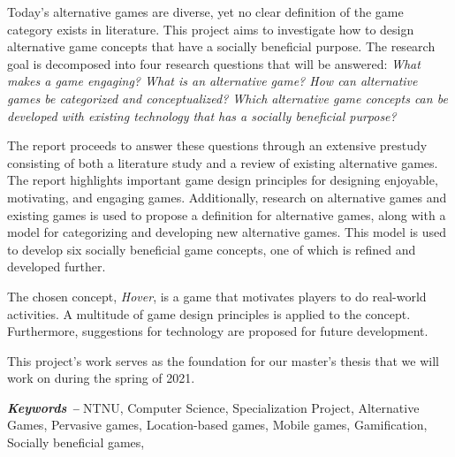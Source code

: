 \documentclass[../Main.tex]{subfiles}
\begin{document}
Today’s alternative games are diverse, yet no clear definition of the game category exists in literature. This project aims to investigate how to design alternative game concepts that have a socially beneficial purpose. The research goal is decomposed into four research questions that will be answered: \textit{What makes a game engaging? What is an alternative game? How can alternative games be categorized and conceptualized? Which alternative game concepts can be developed with existing technology that has a socially beneficial purpose?}

The report proceeds to answer these questions through an extensive prestudy consisting of both a literature study and a review of existing alternative games. The report highlights important game design principles for designing enjoyable, motivating, and engaging games. Additionally, research on alternative games and existing games is used to propose a definition for alternative games, along with a model for categorizing and developing new alternative games. This model is used to develop six socially beneficial game concepts, one of which is refined and developed further. 

The chosen concept, \textit{Hover}, is a game that motivates players to do real-world activities. A multitude of game design principles is applied to the concept. Furthermore, suggestions for technology are proposed for future development. 

This project’s work serves as the foundation for our master’s thesis that we will work on during the spring of 2021.



\par\vspace*{\fill} %
\textbf{\textit{Keywords --}} NTNU, Computer Science, Specialization Project, Alternative Games, Pervasive games, Location-based games, Mobile games, Gamification, Socially beneficial games,  %

\biblio %
\end{document}
